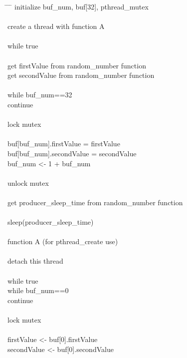 \documentclass[letterpaper,10pt,titlepage]{article}
\begin{document}
\begin{tabbing}
\hspace{3em} \= \hspace{3em} \= \hspace{3em} \=\kill
initialize buf\_num, buf[32], pthread\_mutex \\
\\
create a thread with function A \\
\\
while true\\
\\
    \>get firstValue from random\_number function\\  
    \>get secondValue from random\_number function\\ 
\\       
    \>while buf\_num==32\\     
        \>\>continue\\
    \\
    \>lock mutex \\
    \\
    \>buf[buf\_num].firstValue = firstValue \\
    \>buf[buf\_num].secondValue = secondValue \\
    \>buf\_num \textless- 1 + buf\_num\\
    \\
    \>unlock mutex \\
    \\
    \>get producer\_sleep\_time from random\_number function \\
    \\
    \>sleep(producer\_sleep\_time) \\ 
\\
function A (for pthread\_create use) \\
\\
    \>detach this thread \\
    \\
    \>while true \\ 
        \>\>while buf\_num==0 \\
            \>\>\>continue \\
        \\
        \>\>lock mutex \\
        \\
        \>\>firstValue \textless- buf[0].firstValue \\
        \>\>secondValue \textless- buf[0].secondValue \\
            \\

\end{tabbing}
\end{document}
